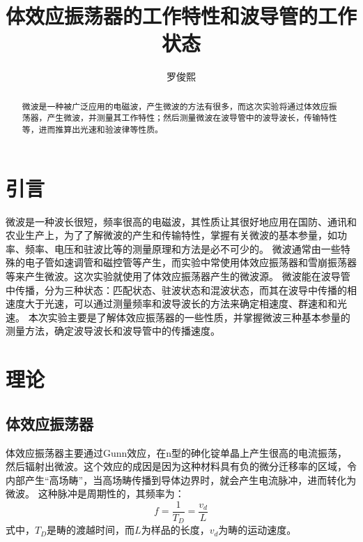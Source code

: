 \documentclass[font=fandol]{mpltx}
\begin{document}
\title{体效应振荡器的工作特性和波导管的工作状态} %
\author{罗俊熙} %
\date{}
\begin{abstract}
	微波是一种被广泛应用的电磁波，产生微波的方法有很多，而这次实验将通过体效应振荡器，产生微波，并测量其工作特性；然后测量微波在波导管中的波导波长，传输特性等，进而推算出光速和验波律等性质。
\end{abstract}

\maketitle

\section{引言}
微波是一种波长很短，频率很高的电磁波，其性质让其很好地应用在国防、通讯和农业生产上，为了了解微波的产生和传输特性，掌握有关微波的基本参量，如功率、频率、电压和驻波比等的测量原理和方法是必不可少的。
微波通常由一些特殊的电子管如速调管和磁控管等产生，而实验中常使用体效应振荡器和雪崩振荡器等来产生微波。这次实验就使用了体效应振荡器产生的微波源。
微波能在波导管中传播，分为三种状态：匹配状态、驻波状态和混波状态，而其在波导中传播的相速度大于光速，可以通过测量频率和波导波长的方法来确定相速度、群速和和光速。
本次实验主要是了解体效应振荡器的一些性质，并掌握微波三种基本参量的测量方法，确定波导波长和波导管中的传播速度。

\section{理论}\label{sec:theory}
\subsection{体效应振荡器}
体效应振荡器主要通过Gunn效应，在n型的砷化锭单晶上产生很高的电流振荡，然后辐射出微波。这个效应的成因是因为这种材料具有负的微分迁移率的区域，令内部产生“高场畴”，当高场畴传播到导体边界时，就会产生电流脉冲，进而转化为微波。
这种脉冲是周期性的，其频率为：
$$f=\frac{1}{T_D}=\frac{v_d}{L}$$
式中，$T_D$是畴的渡越时间，而$L$为样品的长度，$v_d$为畴的运动速度。
\end{document}
